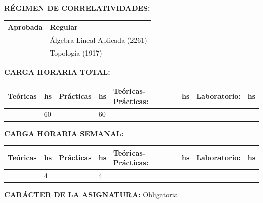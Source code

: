 \documentclass[12pt]{article}
\begin{document}
\textbf{RÉGIMEN DE CORRELATIVIDADES:}

\begin{table}[h]
\begin{tabular}{|l|l|}\hline
 Aprobada & Regular\\\hline
 &
 Álgebra Lineal Aplicada (2261)\\\hline
 &
Topología (1917)\\ \hline
\end{tabular}
 \end{table}






\textbf{CARGA HORARIA TOTAL:}  
\begin{table}[h]
\begin{tabular}{|l|l|l|l|l|l|l|l|}\hline
 Teóricas & hs & Prácticas &  hs & Teóricas-Prácticas: & hs & Laboratorio: & hs \\ \hline
& 60 &  & 60 & & & & \\ \hline
\end{tabular} 
\end{table}

\textbf{CARGA HORARIA SEMANAL:}  
\begin{table}[h]
\begin{tabular}{|l|l|l|l|l|l|l|l|}\hline
 Teóricas & hs & Prácticas &  hs & Teóricas-Prácticas: & hs & Laboratorio: & hs \\ \hline
& 4 &  & 4 & & & & \\ \hline
\end{tabular} 
\end{table}


\textbf{CARÁCTER DE LA ASIGNATURA:} Obligatoria
\renewcommand{\theenumi}{\Alph{enumi}}
\renewcommand{\theenumii}{\theenumi .\arabic{enumii}}

\newpage
\end{document}

